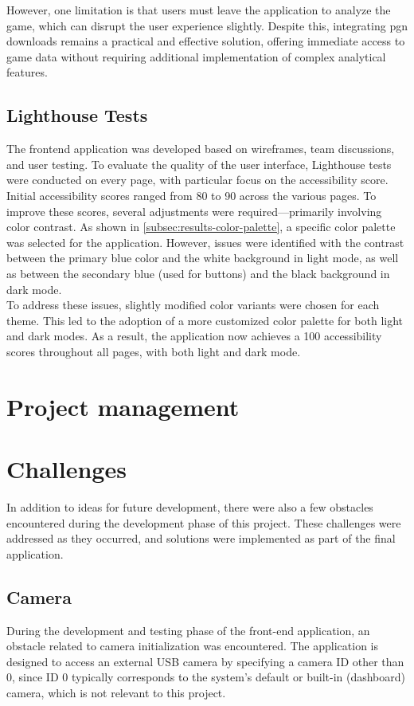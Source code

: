 However, one limitation is that users must leave the application to analyze the game, which can disrupt the user experience slightly. Despite this, integrating \gls{pgn} downloads remains a practical and effective solution, offering immediate access to game data without requiring additional implementation of complex analytical features.

\subsection{Lighthouse Tests}
The frontend application was developed based on wireframes, team discussions, and user testing. To evaluate the quality of the user interface, Lighthouse tests were conducted on every page, with particular focus on the accessibility score. \\

Initial accessibility scores ranged from 80 to 90 across the various pages. To improve these scores, several adjustments were required—primarily involving color contrast. As shown in \ref{subsec:results-color-palette}, a specific color palette was selected for the application. However, issues were identified with the contrast between the primary blue color and the white background in light mode, as well as between the secondary blue (used for buttons) and the black background in dark mode. \\

To address these issues, slightly modified color variants were chosen for each theme. This led to the adoption of a more customized color palette for both light and dark modes. As a result, the application now achieves a 100 accessibility scores throughout all pages, with both light and dark mode. 

\section{Project management}

\section{Challenges}
In addition to ideas for future development, there were also a few obstacles encountered during the development phase of this project. These challenges were addressed as they occurred, and solutions were implemented as part of the final application. \\

\subsection{Camera}
During the development and testing phase of the front-end application, an obstacle related to camera initialization was encountered. The application is designed to access an external USB camera by specifying a camera ID other than 0, since ID 0 typically corresponds to the system's default or built-in (dashboard) camera, which is not relevant to this project.\\

